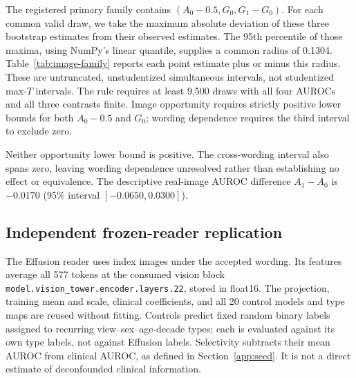 The registered primary family contains $(A_0-0.5,G_0,G_1-G_0)$.
For each common valid draw, we take the maximum absolute deviation of
these three bootstrap estimates from their observed estimates. The
95th percentile of those maxima, using NumPy's linear quantile, supplies
a common radius of 0.1304. Table~\ref{tab:image-family} reports each point
estimate plus or minus this radius. These are untruncated,
unstudentized simultaneous intervals, not studentized max-$T$ intervals.
The rule requires at least 9,500 draws with all four AUROCs and all three
contrasts finite. Image opportunity requires strictly positive lower
bounds for both $A_0-0.5$ and $G_0$; wording dependence requires the third
interval to exclude zero.

\begin{table}[H]
\centering
\caption{Simultaneous image-opportunity and wording contrasts.}
\label{tab:image-family}
\end{table}

Neither opportunity lower bound is positive. The cross-wording interval
also spans zero, leaving wording dependence unresolved rather than
establishing no effect or equivalence. The descriptive real-image AUROC
difference $A_1-A_0$ is $-0.0170$ (95\% interval $[-0.0650,0.0300]$).

\clearpage
\subsection{Independent frozen-reader replication}

The Effusion reader uses index images under the accepted wording. Its
features average all 577 tokens at the consumed vision block
\texttt{model.vision\_tower.encoder.layers.22}, stored in float16.
The projection, training mean and scale, clinical coefficients, and all
20 control models and type maps are reused without fitting. Controls
predict fixed random binary labels assigned to recurring
view--sex--age-decade types; each is evaluated against its own type labels,
not against Effusion labels. Selectivity subtracts their mean AUROC from
clinical AUROC, as defined in Section~\ref{app:seed}. It is not a direct
estimate of deconfounded clinical information.

